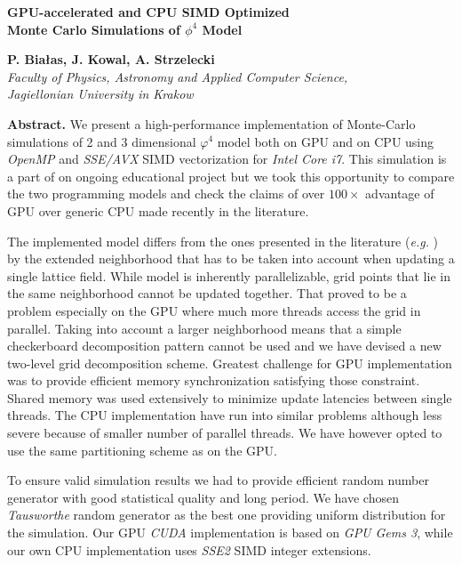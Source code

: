 \documentclass[11pt,a4paper]{article}
\begin{document}
\begin{samepage}
\begin{center}
{\Large{\bf GPU-accelerated and CPU SIMD Optimized \\ Monte Carlo Simulations of $\phi^4$ Model }}

\vspace {5mm}
{\bf P. Białas, J. Kowal, A. Strzelecki}\\
{\em Faculty of Physics, Astronomy and Applied Computer Science, \\ Jagiellonian University in Krakow }\\

\end{center}
\end{samepage}

{\bf Abstract.}  We present a high-performance implementation of
Monte-Carlo simulations of 2 and 3 dimensional $\varphi^4$ model
\cite{PhysRevE.64.066113} both on GPU and on CPU using \emph{OpenMP}
and \emph{SSE/AVX} SIMD vectorization for \emph{Intel Core i7}. This
simulation is a part of on ongoing educational project but we took
this opportunity to compare the two programming models and check the
claims of over $100\times$ advantage of GPU over generic CPU made
recently in the literature.

The implemented model differs from the ones presented in the
literature ({\em e.g.} \cite{Preis20094468}) by the extended
neighborhood that has to be taken into account when updating a single
lattice field. While model is inherently parallelizable, grid points
that lie in the same neighborhood cannot be updated together. That
proved to be a problem especially on the GPU where much more threads
access the grid in parallel.  Taking into account a larger
neighborhood means that a simple checkerboard decomposition pattern
cannot be used and we have devised a new two-level grid decomposition
scheme.  Greatest challenge for GPU implementation was to provide
efficient memory synchronization satisfying those constraint.  Shared
memory was used extensively to minimize update latencies between
single threads.  The CPU implementation have run into similar problems
although less severe because of smaller number of parallel
threads. We have however opted to use the same partitioning scheme as
on the GPU.

To ensure valid simulation results we had to provide efficient random
number generator with good statistical quality and long period. We
have chosen \emph{Tausworthe} random generator\cite{LEcuyer96} as the
best one providing uniform distribution for the simulation. Our GPU
\emph{CUDA} implementation is based on \emph{GPU Gems
  3}\cite{howes_thomas07}, while our own CPU implementation uses
\emph{SSE2} SIMD integer extensions.
\end{document}
